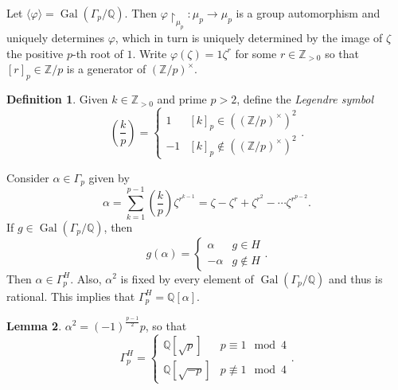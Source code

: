 \documentclass[10pt,letterpaper,cm]{nupset}
\theoremstyle{definition}
\newtheorem{definition}{Definition}[subsection]
\theoremstyle{theorem}
\newtheorem{lemma}[definition]{Lemma}
\theoremstyle{remark}
\newcommand{\Q}{\mathbb Q}
\newcommand{\Z}{\mathbb Z}
\newcommand{\1}{\mathbf{1}}
\newcommand{\0}{\vec 0}
\DeclareMathOperator{\gal}{Gal}
\begin{document}
Let $\langle \varphi \rangle = \gal(\Gamma_p /\Q)$. Then $\varphi \restriction_{\mu_p} : \mu_p \to \mu_p$ is a group automorphism and  uniquely determines $\varphi$, which in turn is uniquely determined by the image of $\zeta$ the positive $p$-th root of $1$. Write $\varphi(\zeta) = 1\zeta^r$ for some $r \in \Z_{>0}$ so that $[r]_p \in \Z/p$ is a generator of $(\Z/p)^{\times}$. 
\begin{definition}
Given $k \in \Z_{>0}$ and prime $p>2$, define the \textit{Legendre symbol} $$\left(\frac{k}{p} \right) = \begin{cases}    1 & [k]_p \in ((\Z/p)^{\times})^2 \\ {-1} & [k]_p \notin  ((\Z/p)^{\times})^2  \end{cases}.$$
\end{definition}
Consider $\alpha \in \Gamma_p$ given by $$  \alpha = \sum_{k=1}^{p-1} \left(\frac{k}{p} \right) \zeta^{r^{k-1}} = \zeta - \zeta^r + \zeta^{r^2} - \cdots \zeta^{r^{p-2}}   .$$ If $g\in \gal(\Gamma_p /\Q)$, then $$ g(\alpha) = \begin{cases}  \alpha & g \in H \\ {-}\alpha & g \notin H   \end{cases} . $$ Then $\alpha \in \Gamma_p^H$. Also, $\alpha^2$ is fixed by every element of $\gal(\Gamma_p/\Q)$ and thus is rational. This implies that $\Gamma_p^H = \Q[\alpha]$.
\begin{lemma}\label{l16}
$\alpha^2 = ({-1})^{\frac{p-1}{2}}p$, so that $$\Gamma_p^H = \begin{cases} \Q[\sqrt{p}] & p \equiv 1 \mod 4 \\ \Q[\sqrt{{-p}}] & p \not \equiv 1 \mod 4   \end{cases}.$$
\end{lemma}
\end{document}
